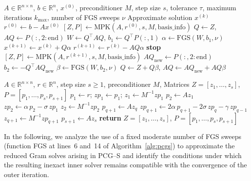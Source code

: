 \documentclass[pdflatex,sn-mathphys-num]{sn-jnl}%
\newcommand{\R}{\mathbb{R}}
\begin{document}
\begin{algorithm}[H]
\caption{Preconditioned $s$--step Conjugate Gradient (PCG--S) Algorithm}
\label{alg:pcgs}
\begin{algorithmic}[1]
\Require $A \in \R^{n \times n}$, $b \in \R^n$, $x^{(0)}$, preconditioner $M$, step size $s$, tolerance $\tau$, maximum iterations $k_{\max}$, number of FGS sweeps $\nu$
\Ensure Approximate solution $x^{(k)}$
\State $r^{(0)} \gets b - A x^{(0)}$
\State $[Z,P] \gets \text{MPK}(A,r^{(0)},s,M,\text{basis\_info})$
\State $Q \gets Z$, \quad $AQ \gets P(:,2:\text{end})$
   \State $W \gets Q^\top AQ$, \quad $b_1 \gets Q^\top P(:,1)$
   \State $\alpha \gets \mathrm{FGS}(W,b_1,\nu)$
   \State $x^{(k+1)} \gets x^{(k)} + Q \alpha$
   \State $r^{(k+1)} \gets r^{(k)} - AQ \alpha$
    \textbf{stop}
   \EndIf
   \State $[Z,P] \gets \text{MPK}(A,r^{(k+1)},s,M,\text{basis\_info})$
   \State $AQ_{\text{new}} \gets P(:,2:\text{end})$
   \State $b_2 \gets - Q^\top AQ_{\text{new}}$
   \State $\beta \gets \mathrm{FGS}(W,b_2,\nu)$
   \State $Q \gets Z + Q \beta$, \quad $AQ \gets AQ_{\text{new}} + AQ \beta$
\EndFor
\end{algorithmic}
\end{algorithm}
%
\begin{algorithm}[H]
\caption{\textsc{MPK} for Chebyshev basis}
\label{alg:MPK}
\begin{algorithmic}[1]
\Require $A\in\R^{n\times n}$, $r\in\R^n$, step size $s\ge 1$, preconditioner $M$, 
\Ensure Matrices $Z=[z_1,\dots,z_s]$, $P=[p_1,\dots,p_s,p_{s+1}]$
\State $p_1 \gets r$; \quad $z\!p_1 \gets p_1$; \quad $z_1 \gets  M^{-1} z\!p_1$
  \State $p_2 \gets A z_1$
  \State $z\!p_2 \gets \alpha\,p_2 - \sigma\,z\!p_1$
  \State $z_2 \gets  M^{-1} z\!p_2$
      \State $p_{q+1} \gets A z_q$
      \State $z\!p_{q+1} \gets 2\alpha\,p_{q+1} - 2\sigma\,z\!p_q - \gamma\,z\!p_{q-1}$
      \State $z_{q+1} \gets M^{-1} z\!p_{q+1}$
    \EndFor
  \EndIf
\EndIf
\State $p_{s+1} \gets A z_s$
\State \textbf{return} $Z=[z_1,\dots,z_s]$, \; $P=[p_1,\dots,p_s,p_{s+1}]$
\end{algorithmic}
\end{algorithm}

In the following, we analyze the use of a fixed moderate number of FGS
sweeps (function FGS at lines~6 and~14 of
Algorithm~\ref{alg:pcgs}) to approximate the reduced Gram solves
arising in PCG--S and identify the conditions under which the
resulting inexact inner solver remains compatible with the
convergence of the outer iteration.
\end{document}
